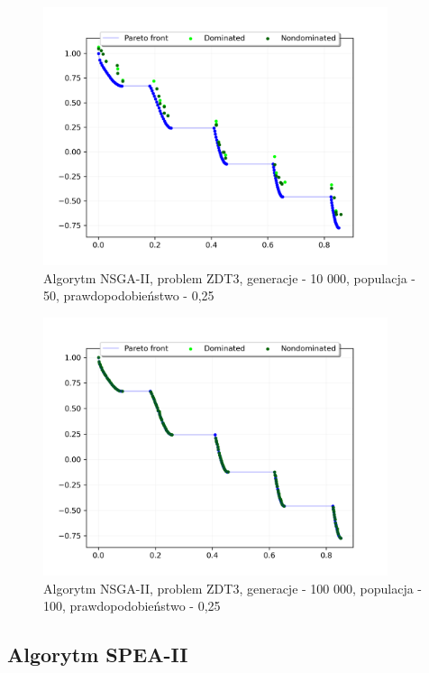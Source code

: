 \documentclass{classrep}
\begin{document}
\begin{figure}[H]
    \centering
    \includegraphics[width=0.9\textwidth]{img2/NSGAII_ZDT3_g10000_p50_r0,25.png}
    \caption{Algorytm NSGA-II, problem ZDT3, \newline generacje - 10 000, populacja - 50, prawdopodobieństwo - 0,25}
\end{figure}

\begin{figure}[H]
    \centering
    \includegraphics[width=0.9\textwidth]{img2/NSGAII_ZDT3_g100000_p100_r0,25.png}
    \caption{Algorytm NSGA-II, problem ZDT3, \newline generacje - 100 000, populacja - 100, prawdopodobieństwo - 0,25}
\end{figure}

\subsection{Algorytm SPEA-II}
\end{document}
